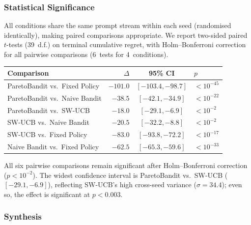 
\subsubsection{Statistical Significance}
\label{sec:nonstat_significance}

All conditions share the same prompt stream within each seed
(randomised identically), making paired comparisons appropriate.
We report two-sided paired $t$-tests (39~d.f.) on terminal
cumulative regret, with Holm--Bonferroni
correction~\cite{holm1979simple} for all pairwise comparisons
(6~tests for 4~conditions).

\begin{center}
\small
\begin{tabular}{@{}lrcl@{}}
\toprule
\textbf{Comparison} & \textbf{$\Delta$} & \textbf{95\% CI} & \textbf{$p$} \\
\midrule
ParetoBandit vs.\ Fixed Policy   & $-101.0$ & $[-103.4, -98.7]$  & $< 10^{-45}$ \\
ParetoBandit vs.\ Naive Bandit   & $-38.5$  & $[-42.1, -34.9]$   & $< 10^{-22}$ \\
ParetoBandit vs.\ SW-UCB         & $-18.0$  & $[-29.1, -6.9]$    & $< 10^{-2}$  \\
SW-UCB vs.\ Naive Bandit      & $-20.5$  & $[-32.2, -8.8]$    & $< 10^{-2}$  \\
SW-UCB vs.\ Fixed Policy      & $-83.0$  & $[-93.8, -72.2]$   & $< 10^{-17}$ \\
Naive Bandit vs.\ Fixed Policy & $-62.5$ & $[-65.3, -59.6]$   & $< 10^{-33}$ \\
\bottomrule
\end{tabular}
\end{center}

\noindent
All six pairwise comparisons remain significant after
Holm--Bonferroni correction ($p < 10^{-2}$).
The widest confidence interval is ParetoBandit vs.\ SW-UCB
($[-29.1, -6.9]$), reflecting SW-UCB's high cross-seed
variance ($\sigma{=}34.4$); even so, the effect is significant
at $p < 0.003$.


\subsubsection{Synthesis}
\label{sec:nonstat_synthesis}

